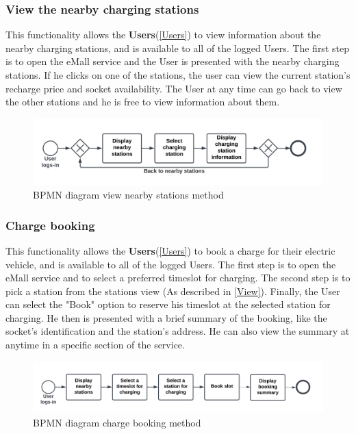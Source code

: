 \subsubsection{View the nearby charging stations}
This functionality allows the \textbf{Users}(\ref{Users}) to view information about the nearby charging stations, and is available to all of the logged Users. 
The first step is to open the eMall service and the User is presented with the nearby charging stations. 
If he clicks on one of the stations, the user can view the current station's recharge price and socket availability.
The User at any time can go back to view the other stations and he is free to view information about them.\label{View}
\begin{figure}[H]
    \begin{center}
        \includegraphics[width=\textwidth]{img/fun-view-info.png}
        \caption{BPMN diagram view nearby stations method}
    \end{center}
\end{figure}
\subsubsection{Charge booking}
This functionality allows the \textbf{Users}(\ref{Users}) to book a charge for their electric vehicle, and is available to all of the logged Users. 
The first step is to open the eMall service and to select a preferred timeslot for charging. The second step is to pick a station from the stations view (As described in \ref{View}).
Finally, the User can select the "Book" option to reserve his timeslot at the selected station for charging.
He then is presented with a brief summary of the booking, like the socket's identification and the station's address.
He can also view the summary at anytime in a specific section of the service.\label{Book} 
\begin{figure}[H]
    \begin{center}
        \includegraphics[width=\textwidth]{img/fun-book-slot.png}
        \caption{BPMN diagram charge booking method}
    \end{center}
\end{figure}
